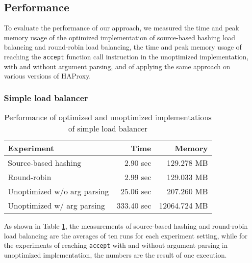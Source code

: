 \subsection{Performance}

To evaluate the performance of our approach, we measured the time and peak
memory usage of the optimized implementation of source-based hashing load
balancing and round-robin load balancing, the time and peak memory usage of
reaching the \texttt{accept} function call instruction in the unoptimized
implementation, with and without argument parsing, and of applying the same
approach on various versions of HAProxy.

\subsubsection{Simple load balancer}

\begin{table}
\centering
\begin{tabular}{l r r}
\toprule
\textbf{Experiment} & \textbf{Time} & \textbf{Memory}\\
\midrule
Source-based hashing        & 2.90 sec & 129.278 MB \\
Round-robin                 & 2.99 sec & 129.033 MB \\
Unoptimized w/o arg parsing & 25.06 sec & 207.260 MB \\
Unoptimized w/ arg parsing  & 333.40 sec & 12064.724 MB \\
\bottomrule
\end{tabular}
\caption{Performance of optimized and unoptimized implementations of simple load
    balancer}
\label{perf-lb}
\end{table}

As shown in Table \ref{perf-lb}, the measurements of source-based hashing and
round-robin load balancing are the averages of ten runs for each experiment
setting, while for the experiments of reaching \texttt{accept} with and without
argument parsing in unoptimized implementation, the numbers are the result of
one execution.

